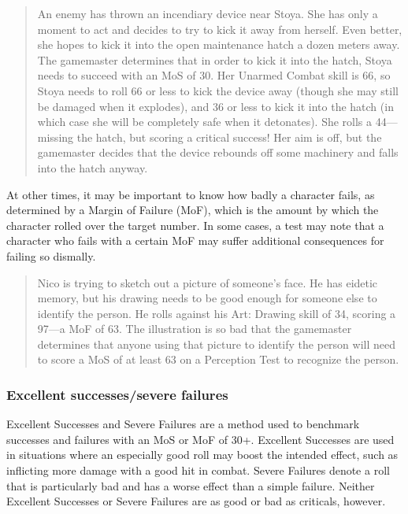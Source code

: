 \begin{quotation}
  An enemy has thrown an incendiary device near Stoya. She has only a
  moment to act and decides to try to kick it away from herself. Even
  better, she hopes to kick it into the open maintenance hatch a dozen
  meters away. The gamemaster determines that in order to kick it into
  the hatch, Stoya needs to succeed with an MoS of 30. Her Unarmed
  Combat skill is 66, so Stoya needs to roll 66 or less to kick the
  device away (though she may still be damaged when it explodes), and
  36 or less to kick it into the hatch (in which case she will be
  completely safe when it detonates). She rolls a 44—missing the
  hatch, but scoring a critical success! Her aim is off, but the
  gamemaster decides that the device rebounds off some machinery and
  falls into the hatch anyway.
\end{quotation}

At other times, it may be important to know how badly a character
fails, as determined by a Margin of Failure (MoF), which is the amount
by which the character rolled over the target number. In some cases, a
test may note that a character who fails with a certain MoF may suffer
additional consequences for failing so dismally.

\begin{quotation}
  Nico is trying to sketch out a picture of someone's face. He has
  eidetic memory, but his drawing needs to be good enough for someone
  else to identify the person. He rolls against his Art: Drawing skill
  of 34, scoring a 97—a MoF of 63. The illustration is so bad that the
  gamemaster determines that anyone using that picture to identify the
  person will need to score a MoS of at least 63 on a Perception Test
  to recognize the person.
\end{quotation}

\subsubsection{Excellent successes/severe failures}
\label{sec:excell-succ-fail}

Excellent Successes and Severe Failures are a method used to benchmark
successes and failures with an MoS or MoF of 30+. Excellent Successes
are used in situations where an especially good roll may boost the
intended effect, such as inflicting more damage with a good hit in
combat. Severe Failures denote a roll that is particularly bad and has
a worse effect than a simple failure. Neither Excellent Successes or
Severe Failures are as good or bad as criticals, however.

